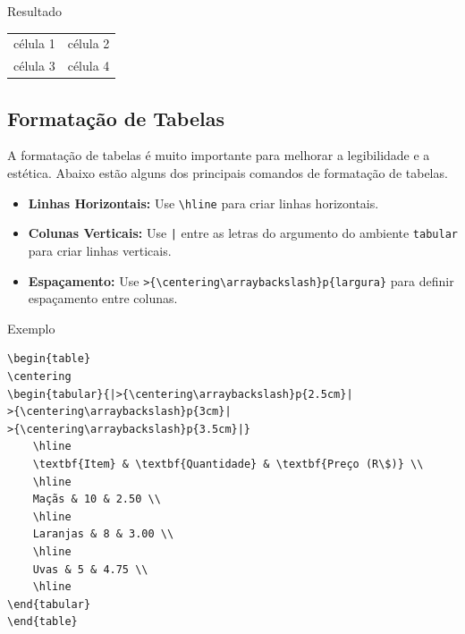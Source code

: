 \begin{trailer}{Resultado}
\vspace{-0.5cm}
\begin{table}
  \centering
  \begin{tabular}{c c}
  célula 1 & célula 2 \\
  célula 3 & célula 4
  \end{tabular}
\end{table}    
\end{trailer}

\subsection{Formatação de Tabelas}
A formatação de tabelas é muito importante para melhorar a legibilidade e a estética. Abaixo estão alguns dos principais comandos de formatação de tabelas.\\

\begin{itemize}
    \item \textbf{Linhas Horizontais:} Use \texttt{\textbackslash hline} para criar linhas horizontais.
    \item \textbf{Colunas Verticais:} Use \texttt{|} entre as letras do argumento do ambiente \texttt{tabular} para criar linhas verticais.
    \item \textbf{Espaçamento:} Use \verb|>{\centering\arraybackslash}p{largura}| para definir espaçamento entre colunas.
\end{itemize}

\begin{trailer}{Exemplo}
\begin{verbatim}
\begin{table}
\centering
\begin{tabular}{|>{\centering\arraybackslash}p{2.5cm}| 
>{\centering\arraybackslash}p{3cm}| 
>{\centering\arraybackslash}p{3.5cm}|}
    \hline
    \textbf{Item} & \textbf{Quantidade} & \textbf{Preço (R\$)} \\
    \hline
    Maçãs & 10 & 2.50 \\
    \hline
    Laranjas & 8 & 3.00 \\
    \hline
    Uvas & 5 & 4.75 \\
    \hline
\end{tabular}
\end{table}
\end{verbatim}   
\end{trailer}

